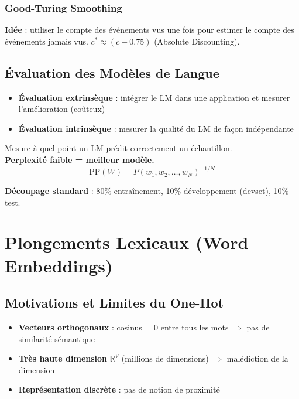 \documentclass[a4paper,10pt]{article}
\begin{document}
\subsubsection{Good-Turing Smoothing}
\textbf{Idée} : utiliser le compte des événements vus une fois pour estimer le compte des événements jamais vus. $c^* \approx (c - 0.75)$ (Absolute Discounting).

\subsection{Évaluation des Modèles de Langue}

\begin{itemize}
  \item \textbf{Évaluation extrinsèque} : intégrer le LM dans une application et mesurer l'amélioration (coûteux)
  \item \textbf{Évaluation intrinsèque} : mesurer la qualité du LM de façon indépendante
\end{itemize}

\begin{definitionbox}[Perplexité]
Mesure à quel point un LM prédit correctement un échantillon.\\
\textbf{Perplexité faible = meilleur modèle.}
\[
\text{PP}(W) = P(w_1, w_2, \ldots, w_N)^{-1/N}
\]
\end{definitionbox}

\textbf{Découpage standard} : 80\% entraînement, 10\% développement (devset), 10\% test.

\section{Plongements Lexicaux (Word Embeddings)}

\subsection{Motivations et Limites du One-Hot}

\begin{warningbox}
\begin{itemize}
  \item \textbf{Vecteurs orthogonaux} : cosinus = 0 entre tous les mots $\Rightarrow$ pas de similarité sémantique
  \item \textbf{Très haute dimension} $\mathbb{R}^V$ (millions de dimensions) $\Rightarrow$ malédiction de la dimension
  \item \textbf{Représentation discrète} : pas de notion de proximité
\end{itemize}
\end{warningbox}
\end{document}
